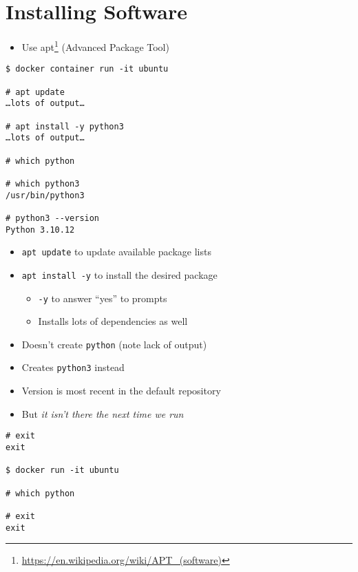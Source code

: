\documentclass[krantzl]{krantz}
\newcommand{\hreffoot}[2]{{#1}\footnote{\href{#2}{#2}}}
\begin{document}
\section{Installing Software}
\begin{itemize}
\item Use \hreffoot{apt}{https://en.wikipedia.org/wiki/APT_(software)} (Advanced Package Tool)

\end{itemize}
\begin{lstlisting}[frame=tblr,backgroundcolor=\color{black!5}]
$ docker container run -it ubuntu

# apt update
…lots of output…

# apt install -y python3
…lots of output…

# which python

# which python3
/usr/bin/python3

# python3 --version
Python 3.10.12
\end{lstlisting}

\begin{itemize}
\item \texttt{apt update} to update available package lists

\item \texttt{apt install -y} to install the desired package\begin{itemize}
\item \texttt{-y} to answer “yes” to prompts

\item Installs lots of dependencies as well

\end{itemize}


\item Doesn’t create \texttt{python} (note lack of output)

\item Creates \texttt{python3} instead

\item Version is most recent in the default repository

\item But \emph{it isn’t there the next time we run}

\end{itemize}
\begin{lstlisting}[frame=tblr,backgroundcolor=\color{black!5}]
# exit
exit

$ docker run -it ubuntu

# which python

# exit
exit
\end{lstlisting}
\end{document}
